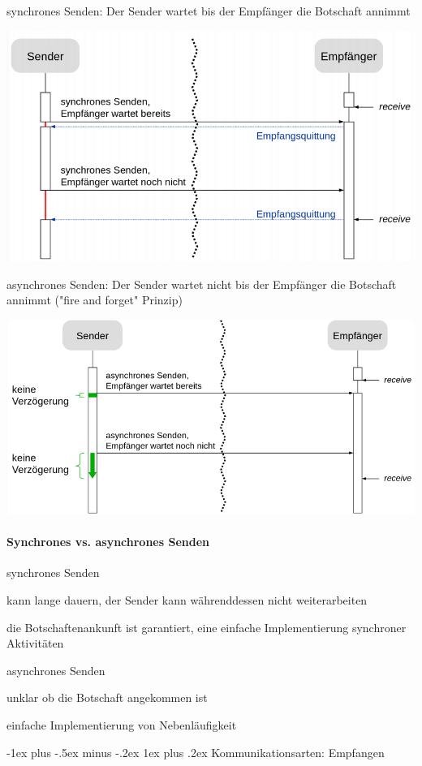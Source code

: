 \documentclass[10pt]{article}
\makeatletter
\renewcommand{\subsubsection}{\@startsection{subsubsection}{3}{0mm}%
                                {-1ex plus -.5ex minus -.2ex}%
                                {1ex plus .2ex}%
                                {\normalfont\small\bfseries}}
\makeatother
\begin{document}
\color{orange} synchrones Senden: \color{black} Der Sender wartet bis der Empfänger die Botschaft annimmt
\begin{center}
  \includegraphics[width=0.4\linewidth]{Assets/Programmierparadigmen-synchrones-senden}
\end{center}
\noindent \color{orange} asynchrones Senden: \color{black} Der Sender wartet nicht bis der Empfänger die Botschaft annimmt ("fire and forget" Prinzip)
\begin{center}
  \includegraphics[width=0.4\linewidth]{Assets/Programmierparadigmen-asynchrones-senden}
\end{center}

\paragraph{Synchrones vs. asynchrones Senden}

\begin{itemize*}
  \item synchrones Senden
  \begin{itemize*}
    \item kann lange dauern, der Sender kann währenddessen nicht weiterarbeiten
    \item die Botschaftenankunft ist garantiert, eine einfache Implementierung synchroner Aktivitäten
  \end{itemize*}
  \item asynchrones Senden
  \begin{itemize*}
    \item unklar ob die Botschaft angekommen ist
    \item einfache Implementierung von Nebenläufigkeit
  \end{itemize*}
\end{itemize*}

\subsubsection{Kommunikationsarten: Empfangen}
\end{document}
